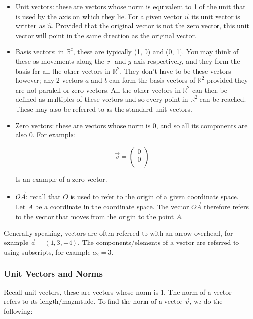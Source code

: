 \documentclass[a4paper,oneside]{report}
\begin{document}
\begin{itemize}
	\item{Unit vectors: these are vectors whose norm is equivalent to
		1 of the unit that is used by the axis on which they lie. For
		a given vector \( \overrightarrow{u} \) its unit vector is
		written as \( \hat{u} \). Provided that the original vector is
		not the zero vector, this unit vector will point in the same
		direction as the original vector.}
	\item{Basis vectors: in \( \mathbb{R}^2 \), these are typically (1, 0)
		and (0, 1). You may think of these as movements along the
		\( x \)- and \( y \)-axis respectively, and they form the
		basis for all the other vectors in \( \mathbb{R}^2 \). They
		don't have to be these vectors however; any 2 vectors \( a \)
		and \( b \) can form the basis vectors of \( \mathbb{R}^2 \)
		provided they are not paralell or zero vectors. All the other
		vectors in \( \mathbb{R}^2 \) can then be defined as multiples
		of these vectors and so every point in \( \mathbb{R}^2 \) can
		be reached. These may also be referred to as the standard
		unit vectors.}
	\item{Zero vectors: these are vectors whose norm is 0, and so all its
		components are also 0. For example:
		
		\[ \overrightarrow{v} = \begin{pmatrix}
			0 \\
			0 \\
		\end{pmatrix} \]

		Is an example of a zero vector.}
	\item{\( \overrightarrow{OA} \): recall that \( O \) is used to refer
		to the origin of a given coordinate space. Let \( A \) be a
		coordinate in the coordinate space. The vector
		\( \overrightarrow{OA} \) therefore refers to the vector that
		moves from the origin to the point \( A \).}
\end{itemize}

Generally speaking, vectors are often referred to with an arrow overhead,
for example \( \overrightarrow{a} = (1, 3, -4) \). The components/elements of
a vector are referred to using subscripts, for example \( a_2 = 3\).

\subsubsection{Unit Vectors and Norms}

Recall unit vectors, these are vectors whose norm is 1. The norm of a vector
refers to its length/magnitude. To find the norm of a vector
\( \overrightarrow{v} \), we do the following:
\end{document}
